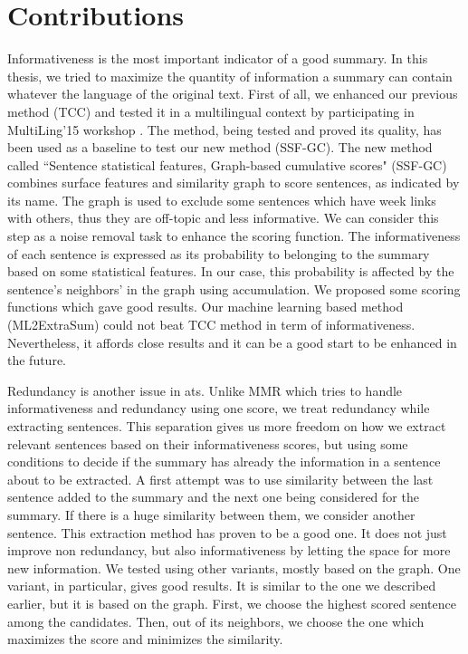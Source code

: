 \section{Contributions}

Informativeness is the most important indicator of a good summary.
In this thesis, we tried to maximize the quantity of information a summary can contain whatever the language of the original text. 
First of all, we enhanced our previous method (TCC) \citep{13-aries-al} and tested it in a multilingual context by participating in MultiLing'15 workshop \citep{15-aries-al}.
The method, being tested and proved its quality, has been used as a baseline to test our new method (SSF-GC). 
The new method called ``Sentence statistical features, Graph-based cumulative scores" (SSF-GC) combines surface features and similarity graph to score sentences, as indicated by its name. 
The graph is used to exclude some sentences which have week links with others, thus they are off-topic and less informative. 
We can consider this step as a noise removal task to enhance the scoring function. 
The informativeness of each sentence is expressed as its probability to belonging to the summary based on some statistical features. 
In our case, this probability is affected by the sentence's neighbors' in the graph using accumulation.
We proposed some scoring functions which gave good results.
Our machine learning based method (ML2ExtraSum) could not beat TCC method in term of informativeness. 
Nevertheless, it affords close results and it can be a good start to be enhanced in the future.


Redundancy is another issue in \ac{ats}. 
Unlike MMR \citep{98-carbonell-goldstein} which tries to handle informativeness and redundancy using one score, we treat redundancy while extracting sentences. 
This separation gives us more freedom on how we extract relevant sentences based on their informativeness scores, but using some conditions to decide if the summary has already the information in a sentence about to be extracted. 
A first attempt was to use similarity between the last sentence added to the summary and the next one being considered for the summary. 
If there is a huge similarity between them, we consider another sentence. 
This extraction method has proven to be a good one. 
It does not just improve non redundancy, but also informativeness by letting the space for more new information. 
We tested using other variants, mostly based on the graph. 
One variant, in particular, gives good results. 
It is similar to the one we described earlier, but it is based on the graph. 
First, we choose the highest scored sentence among the candidates. 
Then, out of its neighbors, we choose the one which maximizes the score and minimizes the similarity.  

